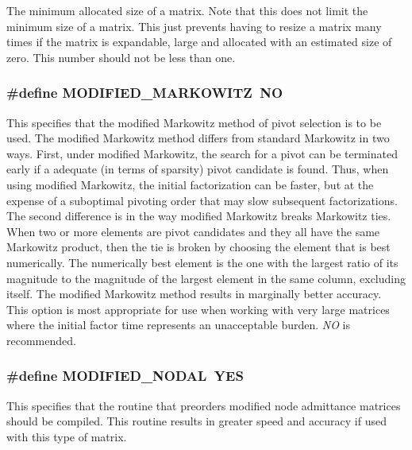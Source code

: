 The minimum allocated size of a matrix. Note that this does not limit the minimum size of a matrix. This just prevents having to resize a matrix many times if the matrix is expandable, large and allocated with an estimated size of zero. This number should not be less than one. 
\subsubsection{\setlength{\rightskip}{0pt plus 5cm}\#define MODIFIED\_\-MARKOWITZ\ NO}\label{spConfig_8h_a6}


This specifies that the modified Markowitz method of pivot selection is to be used. The modified Markowitz method differs from standard Markowitz in two ways. First, under modified Markowitz, the search for a pivot can be terminated early if a adequate (in terms of sparsity) pivot candidate is found. Thus, when using modified Markowitz, the initial factorization can be faster, but at the expense of a suboptimal pivoting order that may slow subsequent factorizations. The second difference is in the way modified Markowitz breaks Markowitz ties. When two or more elements are pivot candidates and they all have the same Markowitz product, then the tie is broken by choosing the element that is best numerically. The numerically best element is the one with the largest ratio of its magnitude to the magnitude of the largest element in the same column, excluding itself. The modified Markowitz method results in marginally better accuracy. This option is most appropriate for use when working with very large matrices where the initial factor time represents an unacceptable burden. {\em NO} is recommended. 
\subsubsection{\setlength{\rightskip}{0pt plus 5cm}\#define MODIFIED\_\-NODAL\ YES}\label{spConfig_8h_a9}


This specifies that the routine that preorders modified node admittance matrices should be compiled. This routine results in greater speed and accuracy if used with this type of matrix. 
